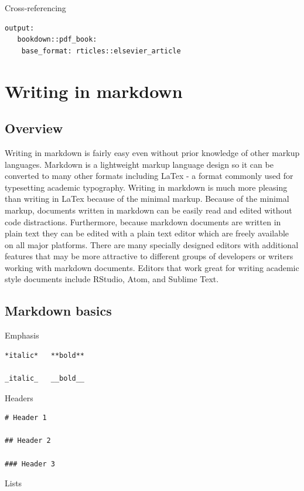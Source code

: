 \documentclass[]{book}
\begin{document}
Cross-referencing

\begin{verbatim}
output:
   bookdown::pdf_book:
    base_format: rticles::elsevier_article
\end{verbatim}

\section{Writing in markdown}\label{writing-in-markdown}

\subsection{Overview}\label{overview}

Writing in markdown is fairly easy even without prior knowledge of other
markup languages. Markdown is a lightweight markup language design so it
can be converted to many other formats including LaTex - a format
commonly used for typesetting academic typography. Writing in markdown
is much more pleasing than writing in LaTex because of the minimal
markup. Because of the minimal markup, documents written in markdown can
be easily read and edited without code distractions. Furthermore,
because markdown documents are written in plain text they can be edited
with a plain text editor which are freely available on all major
platforms. There are many specially designed editors with additional
features that may be more attractive to different groups of developers
or writers working with markdown documents. Editors that work great for
writing academic style documents include RStudio, Atom, and Sublime
Text.

\subsection{Markdown basics}\label{markdown-basics}

Emphasis

\begin{verbatim}
*italic*   **bold**

_italic_   __bold__
\end{verbatim}

Headers

\begin{verbatim}
# Header 1

## Header 2

### Header 3
\end{verbatim}

Lists
\end{document}
